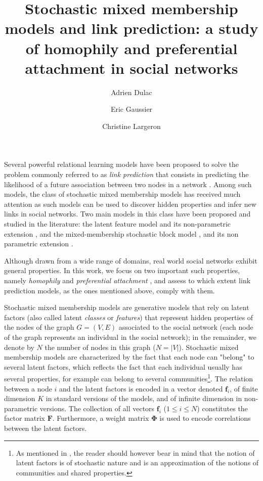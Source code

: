 \documentclass[9pt,twocolumn,twoside]{pnas-new}
\title{ Stochastic mixed membership models and link prediction: a study of homophily and preferential attachment in social networks}
\author[a,b]{Adrien Dulac}
\author[a]{Eric Gaussier}
\author[b,1]{Christine Largeron}
\affil[a]{Univ. Grenoble Alpes, CNRS, Grenoble INP, LIG - F-38000 Grenoble}
\affil[b]{Universit\'e Jean Monnet, Laboratoire Hubert Curien - F-42000 Saint-Etienne}
\newcommand{\mat}[1]{\mathbf{#1}}
\begin{document}
\verticaladjustment{-2pt}

\maketitle
\thispagestyle{firststyle}

\label{sec:intro}

Several powerful relational learning models have been proposed to solve the problem commonly referred to as \textit{link prediction} that consists in predicting the likelihood of a future association between two nodes in a network \cite{Liben-Nowell07, HassanZaki11}. Among such models, the class of stochastic mixed membership models has received much attention as such models can be used to discover hidden properties and infer new links in social networks. Two main models in this class have been proposed and studied in the literature: the latent feature model \cite{BMF} and its non-parametric extension \cite{ILFRM}, and the mixed-membership stochastic block model \cite{MMSB}, and its non parametric extension \cite{iMMSB,diMMSB}.

Although drawn from a wide range of domains, real world social networks exhibit general properties. In this work, we focus on two important such properties, namely \textit{homophily} and \textit{preferential attachment} \cite{Newman2010, Barabasi2003}, and assess to which extent link prediction models, as the ones mentioned above, comply with them.

Stochastic mixed membership models are generative models that rely on latent factors (also called latent \textit{classes} or \textit{features}) that represent hidden properties of the nodes of the graph $G=(V,E)$ associated to the social network (each node of the graph represents an individual in the social network); in the remainder, we denote by $N$ the number of nodes in this graph ($N=|V|$). Stochastic mixed membership models are characterized by the fact that each node can "belong" to several latent factors, which reflects the fact that each individual usually has several properties, for example can belong to several communities\footnote{As mentioned in \cite{goldenberg2010survey}, the reader should however bear in mind that the notion of latent factors is of stochastic nature and is an approximation of the notions of communities and shared properties.}. The relation between a node $i$ and the latent factors is encoded in a vector denoted $\mat{f}_{i}$, of finite dimension $K$ in standard versions of the models, and of infinite dimension in  non-parametric versions. The collection of all vectors $\mat{f}_{i}$ ($1 \le i \le N$) constitutes the factor matrix $\mat{F}$. Furthermore, a weight matrix $\mat{\Phi}$ is used to encode correlations between the latent factors.
\end{document}
